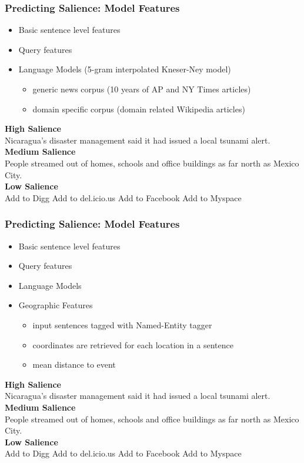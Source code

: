 \documentclass{beamer}
\begin{document}
\begin{frame}
\frametitle{Predicting Salience: Model Features}
\begin{itemize}
\item Basic sentence level features
\item Query features
\item Language Models (5-gram interpolated Kneser-Ney model)
\begin{itemize}
\item \alert<2>{generic news corpus (10 years of AP and NY Times articles)}
\item \alert<4>{domain specific corpus (domain related Wikipedia articles)}
\end{itemize}
\end{itemize}

\pause
\textbf{High Salience}\\ 
\alert<2,4>{Nicaragua's disaster management said it had issued a local tsunami alert.}\\
\textbf{Medium Salience} \\
\alert<2>{People streamed out of homes, schools and office buildings as far north as Mexico City.}\\
\textbf{Low Salience} \\
Add to Digg Add to del.icio.us Add to Facebook Add to Myspace 


\end{frame}


\begin{frame}
\frametitle{Predicting Salience: Model Features}
\begin{itemize}
\item Basic sentence level features
\item Query features
\item Language Models
\item Geographic Features
\begin{itemize}
\item input sentences tagged with Named-Entity tagger
\item coordinates are retrieved for each location in a sentence
\item mean distance to event
\end{itemize}
\end{itemize}

\pause
\textbf{High Salience}\\ 
\alert<2>{Nicaragua's} disaster management said it had issued a local tsunami alert.\\
\textbf{Medium Salience} \\
People streamed out of homes, schools and office buildings as far north as \alert<2>{Mexico City.}\\
\textbf{Low Salience} \\
Add to Digg Add to del.icio.us Add to Facebook Add to Myspace 



\end{frame}
\end{document}
